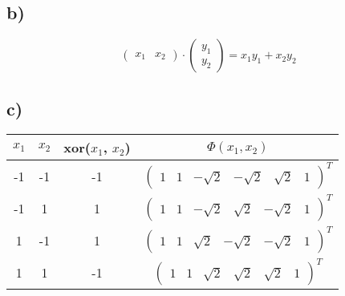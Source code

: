\documentclass[a4paper,parskip=full-]{article}
\begin{document}
\subsection{b)}

$$
\begin{pmatrix}
x_1 & x_2
\end{pmatrix}
\cdot \begin{pmatrix}
y_1 \\ y_2
\end{pmatrix}
= x_1 y_1 + x_2 y_2
$$

\subsection{c)}
\begin{tabular}{|c|c|c|c|}
\hline
$x_1$ & $x_2$ & xor($x_1$, $x_2$) & $\Phi(x_1,x_2)$ \\
\hline \hline
-1 & -1 & -1 & $
\begin{pmatrix}
 1 &
 1 &
 -\sqrt{2} &
 -\sqrt{2} &
 \sqrt{2} &
 1 
\end{pmatrix}^T$ \\
\hline
-1 & 1 & 1 & $\begin{pmatrix}
 1 &
 1 &
 -\sqrt{2} &
 \sqrt{2} &
 -\sqrt{2} &
 1 
\end{pmatrix}^T$ \\
\hline
1 & -1 & 1 & $\begin{pmatrix}
 1 &
 1 &
 \sqrt{2} &
 -\sqrt{2} &
 -\sqrt{2} &
 1 
\end{pmatrix}^T$ \\
\hline
1 & 1 & -1 & $\begin{pmatrix}
 1 &
 1 &
 \sqrt{2} &
 \sqrt{2} &
 \sqrt{2} &
 1 
\end{pmatrix}^T$ 
\label{tab:xor}
\end{tabular}
\end{document}
